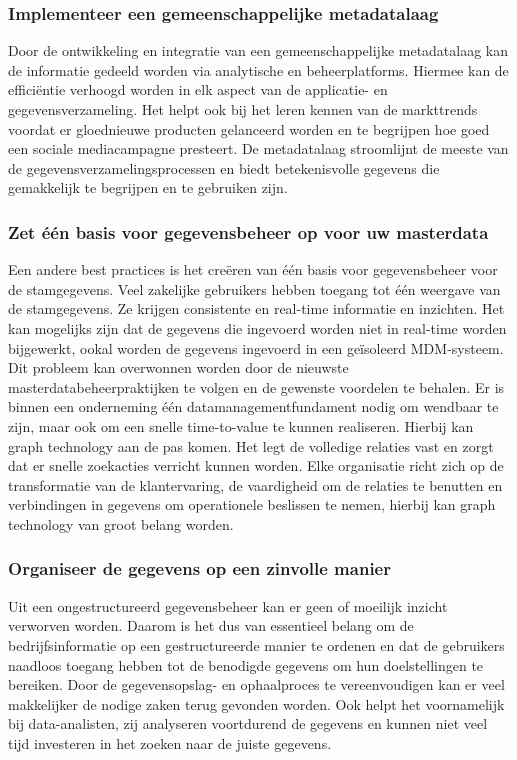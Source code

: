 \subsubsection{Implementeer een gemeenschappelijke metadatalaag}
Door de ontwikkeling en integratie van een gemeenschappelijke metadatalaag kan de informatie gedeeld worden via analytische en beheerplatforms. Hiermee kan de efficiëntie verhoogd worden in elk aspect van de applicatie- en gegevensverzameling. Het helpt ook bij het leren kennen van de markttrends voordat er gloednieuwe producten gelanceerd worden en te begrijpen hoe goed een sociale mediacampagne presteert. De metadatalaag stroomlijnt de meeste van de gegevensverzamelingsprocessen en biedt betekenisvolle gegevens die gemakkelijk te begrijpen en te gebruiken zijn.

\subsubsection{Zet één basis voor gegevensbeheer op voor uw masterdata}
Een andere best practices is het creëren van één basis voor gegevensbeheer voor de stamgegevens. Veel zakelijke gebruikers hebben toegang tot één weergave van de stamgegevens. Ze krijgen consistente en real-time informatie en inzichten. Het kan mogelijks zijn dat de gegevens die ingevoerd worden niet in real-time worden bijgewerkt, ookal worden de gegevens ingevoerd in een geïsoleerd MDM-systeem. Dit probleem kan overwonnen worden door de nieuwste masterdatabeheerpraktijken te volgen en de gewenste voordelen te behalen. Er is binnen een onderneming één datamanagementfundament nodig om wendbaar te zijn, maar ook om een snelle time-to-value te kunnen realiseren.
Hierbij kan graph technology aan de pas komen. Het legt de volledige relaties vast en zorgt dat er snelle zoekacties verricht kunnen worden. Elke organisatie richt zich op de transformatie van de klantervaring, de vaardigheid om de relaties te benutten en verbindingen in gegevens om operationele beslissen te nemen, hierbij kan graph technology van groot belang worden. 

\subsubsection{Organiseer de gegevens op een zinvolle manier}
Uit een ongestructureerd gegevensbeheer kan er geen of moeilijk inzicht verworven worden. Daarom is het dus van essentieel belang om de bedrijfsinformatie op een gestructureerde manier te ordenen en dat de gebruikers naadloos toegang hebben tot de benodigde gegevens om hun doelstellingen te bereiken. Door de gegevensopslag- en ophaalproces te vereenvoudigen kan er veel makkelijker de nodige zaken terug gevonden worden. Ook helpt het voornamelijk bij data-analisten, zij analyseren voortdurend de gegevens en kunnen niet veel tijd investeren in het zoeken naar de juiste gegevens. 

